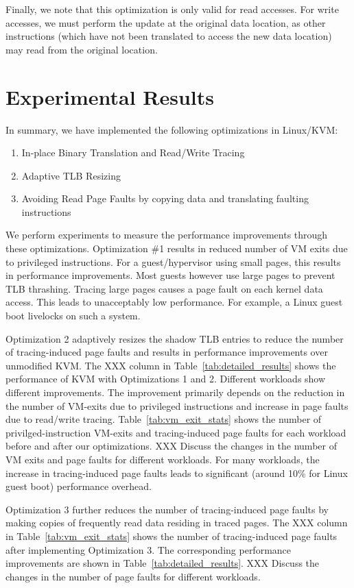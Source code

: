 \documentclass[10pt,twocolumn]{article}
\begin{document}
Finally, we note that this optimization is only valid for read accesses. For write
accesses, we must perform the update at the original data location, as other
instructions (which have not been translated to access the new data location) may
read from the original location.
\section{Experimental Results}
\label{sec:results}
In summary, we have implemented the following optimizations in Linux/KVM:
\begin{enumerate}
  \item In-place Binary Translation and Read/Write Tracing
  \item Adaptive TLB Resizing
  \item Avoiding Read Page Faults by copying data and translating faulting instructions
\end{enumerate}
We perform experiments to measure the performance improvements through these
optimizations. Optimization \#1 results in reduced number of VM exits due
to privileged instructions. For a guest/hypervisor using small pages, this results
in performance improvements. Most guests however use large pages to prevent
TLB thrashing. Tracing large pages causes a page fault on each kernel data access.
This leads to unacceptably low performance. For example, a Linux guest boot livelocks
on such a system.

Optimization 2 adaptively resizes the shadow TLB entries to reduce
the number of tracing-induced page faults and results in
performance improvements over unmodified KVM. The XXX column
in Table~\ref{tab:detailed_results} shows the performance of KVM with Optimizations
1 and 2.
Different workloads show different improvements. The improvement primarily depends
on the reduction in the number of VM-exits due to privileged instructions and
increase in page faults due to read/write tracing.
Table~\ref{tab:vm_exit_stats} shows the number of
privilged-instruction VM-exits and tracing-induced page faults for each workload
before and after our optimizations. XXX Discuss the changes in the number
of VM exits and page faults for different workloads.
For many workloads, the increase in tracing-induced page faults leads
to significant (around 10\% for Linux guest boot) performance overhead.

Optimization 3 further reduces the number of tracing-induced page faults by
making copies of frequently read data residing in traced pages. The XXX column in
Table~\ref{tab:vm_exit_stats} shows the number of tracing-induced page faults
after implementing Optimization 3. The corresponding performance improvements
are shown in Table~\ref{tab:detailed_results}. XXX Discuss the changes in the number
of page faults for different workloads.
\end{document}
